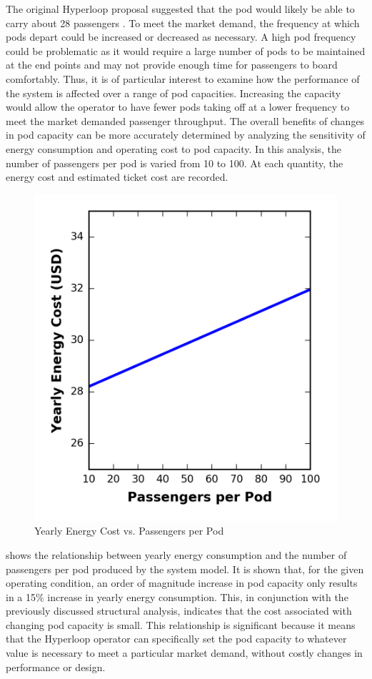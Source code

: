 The original Hyperloop proposal suggested
that the pod would likely be able to carry about 28 passengers \cite{Musk}.
To meet the market demand, the frequency at which pods depart could be
increased or decreased as necessary. A high pod frequency could be
problematic as it would require a large number of pods to be maintained at
the end points and may not provide enough time for passengers to board comfortably.
Thus, it is of particular interest to examine how the performance of the system
is affected over a range of pod capacities. Increasing the capacity would allow
the operator to have fewer pods taking off at a lower frequency to meet
the market demanded passenger throughput. The overall benefits of
changes in pod capacity can be more accurately determined by analyzing the
sensitivity of energy consumption and operating cost to pod capacity.
In this analysis, the number of passengers per pod is varied from 10 to 100.
At each quantity, the energy cost and estimated ticket cost are recorded.
\begin{figure}
	\centering
	\includegraphics[width=.45\textwidth]{../../images/graphs/capacity_trades/passengers_vs_energy.png}
	\caption{Yearly Energy Cost vs. Passengers per Pod}
	\label{fig:energy_cost_vs_passengers}
\end{figure}
 shows the relationship between yearly
energy consumption and the number of passengers per pod produced by the system model.
It is shown that, for the given operating condition, an order of magnitude
increase in pod capacity only results in a 15\% increase in yearly energy consumption.
This, in conjunction with the previously discussed structural analysis,
indicates that the cost associated with changing pod capacity is small.
This relationship is significant because it means that the Hyperloop operator
can specifically set the pod capacity to whatever value is necessary to meet a
particular market demand, without costly changes in performance or design.
